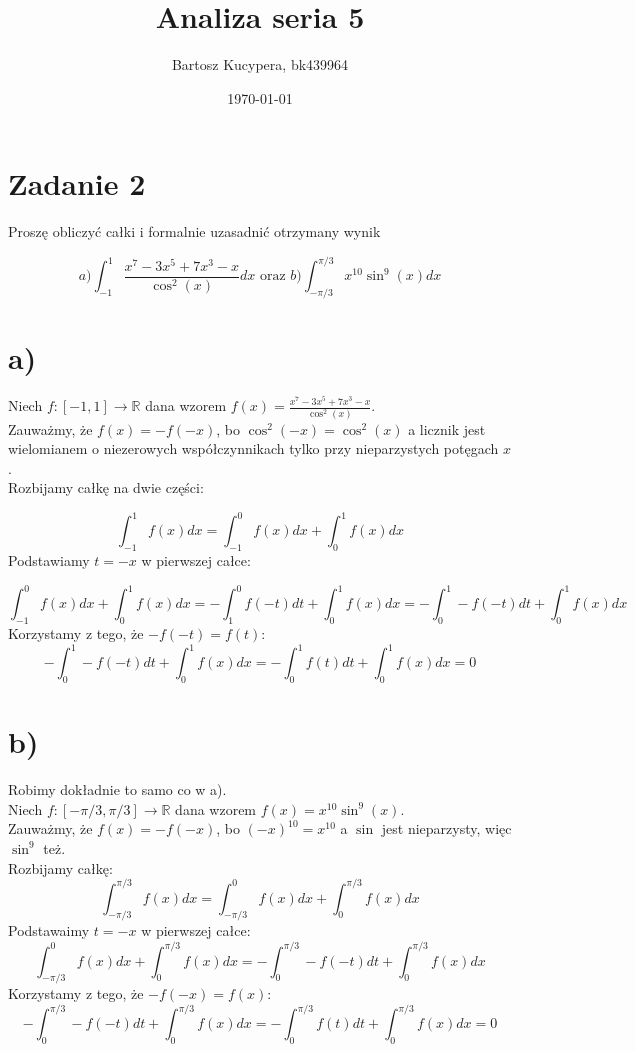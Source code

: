 \documentclass{article}
\title{Analiza seria 5}
\author{Bartosz Kucypera, bk439964}
\date{\today}
\begin{document}
\maketitle

\section*{Zadanie 2} 
Proszę obliczyć całki i formalnie uzasadnić otrzymany wynik

$$ a) \int_{-1}^1 \frac{x^7-3x^5 +7x^3-x}{\cos^2(x)}dx \mbox{ oraz } 
b) \int_{-\pi/3}^{\pi/3}x^{10}\sin ^9(x)dx $$

\section*{a)}
Niech $f:[-1,1] \to \mathbb{R}$ dana wzorem $f(x) = \frac{x^7-3x^5+7x^3-x}{\cos^2(x)}$. \\
Zauważmy, że $f(x) = -f(-x)$, bo $\cos^2(-x) = \cos^2(x)$ a licznik jest wielomianem o niezerowych współczynnikach tylko przy nieparzystych potęgach $x$. \\
Rozbijamy całkę na dwie części:

$$\int_{-1}^{1}f(x)dx = \int_{-1}^0f(x)dx + \int_0^1f(x)dx$$
Podstawiamy $t = -x$ w pierwszej całce:

$$\int_{-1}^0f(x)dx + \int_0^1f(x)dx = -\int_1^0f(-t)dt + \int_0^1f(x)dx = -\int_0^1-f(-t)dt + \int_0^1f(x)dx$$ 
Korzystamy z tego, że $-f(-t) = f(t)$:
$$-\int_0^1-f(-t)dt + \int_0^1f(x)dx = -\int_0^1f(t)dt + \int_0^1f(x)dx = 0$$

\section*{b)}
Robimy dokładnie to samo co w a). \\
Niech $f:[-\pi/3, \pi/3] \to \mathbb{R}$ dana wzorem $f(x) = x^{10}\sin^9(x)$. \\
Zauważmy, że $f(x) = -f(-x)$, bo $(-x)^{10} = x^{10}$ a $\sin$ jest nieparzysty, więc $\sin^9$ też. \\
Rozbijamy całkę:
$$ \int_{-\pi/3}^{\pi/3}f(x)dx = \int_{-\pi/3}^{0}f(x)dx + \int_{0}^{\pi/3}f(x)dx$$
Podstawaimy $t=-x$ w pierwszej całce:
$$\int_{-\pi/3}^{0}f(x)dx + \int_{0}^{\pi/3}f(x)dx = -\int_0^{\pi/3}-f(-t)dt + \int_0^{\pi/3}f(x)dx$$
Korzystamy z tego, że $-f(-x) = f(x)$:
$$-\int_0^{\pi/3}-f(-t)dt + \int_0^{\pi/3}f(x)dx = -\int_0^{\pi/3}f(t)dt + \int_0^{\pi/3}f(x)dx = 0$$
\end{document}

